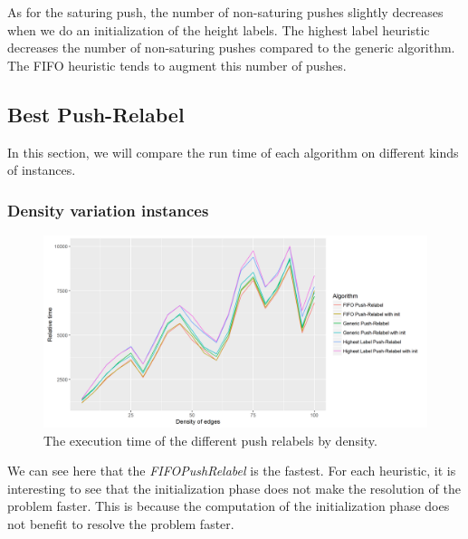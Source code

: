 As for the saturing push, the number of non-saturing pushes slightly decreases when we do an initialization of the height labels. The highest label heuristic decreases the number of non-saturing pushes compared to the generic algorithm. The FIFO heuristic tends to augment this number of pushes.



\subsection{Best Push-Relabel}

In this section, we will compare the run time of each algorithm on different kinds of instances.

\subsubsection{Density variation instances}
\begin{figure}[H]
\begin{center}
\includegraphics[scale=0.5]{images/meandensitypr.png}
\caption{The execution time of the different push relabels by density.}
\label{fig:mean_density_pr}
\end{center}
\end{figure}

We can see here that the \textit{FIFOPushRelabel} is the fastest. For each heuristic, it is interesting to see that the initialization phase does not make the resolution of the problem faster. This is because the computation of the initialization phase does not benefit to resolve the problem faster. 


